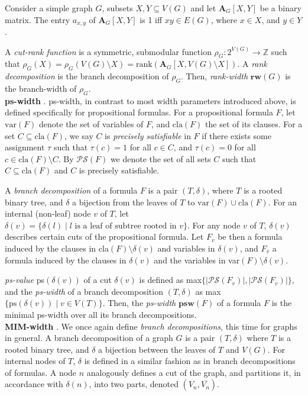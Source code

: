\documentclass{article}
\begin{document}
Consider a simple graph $G$, subsets $X,Y \subseteq V(G)$ and let $\mathbf{A}_G[X,Y]$ be a binary matrix.
The entry $a_{x,y}$ of $\mathbf{A}_G[X,Y]$ is 1 iff $xy \in E(G)$, where $x\in X$, and $y\in Y$.

A {\em cut-rank function} is a symmetric, submodular function $\rho_G : 2^{V(G)} \rightarrow \mathbb{Z}$ such that $\rho_G(X)=\rho_G(V(G)\setminus X) = \text{rank}(\mathbf{A}_G[X, V(G)\setminus X])$.
A {\em rank decomposition} is the branch decomposition of $\rho_G$.
Then, {\em rank-width} $\textbf{rw}(G)$ is the branch-width of $\rho_G$. \\


\noindent
\textbf{ps-width} \cite{DBLP:conf/sat/SaetherTV14}.
ps-width, in contrast to most width parameters introduced above, is defined specifically for propositional formulas.
For a propositional formula $F$, let $\text{var}(F)$ denote the set of variables of $F$, and $\text{cla}(F)$ the set of its clauses.
For a set $C \subseteq \text{cla}(F)$, we say $C$ is {\em precisely satisfiable} in $F$ if there exists some assignment $\tau$ such that $\tau(c)=1$ for all $c\in C$, and $\tau(c)=0$ for all $c \in \text{cla}(F)\setminus C$.
By $\mathcal{PS}(F)$ we denote the set of all sets $C$ such that $C \subseteq \text{cla}(F)$ and $C$ is precisely satisfiable.


A {\em branch decomposition} of a formula $F$ is a pair $(T, \delta)$, where $T$ is a rooted binary tree, and $\delta$ a bijection from the leaves of $T$ to $\text{var}(F) \cup \text{cla}(F)$.
For an internal (non-leaf) node $v$ of $T$, let $\delta(v) = \{ \delta(l) \; | \; l \text{ is a leaf of subtree rooted in } v \}$.
For any node $v$ of $T$, $\delta(v)$ describes certain cuts of the propositional formula.
Let $F_v$ be then a formula induced by the clauses in cla$(F)\setminus \delta(v)$ and variables in $\delta(v)$, and $F_{\overline{v}}$ a formula induced by the clauses in $\delta(v)$ and the variables in var$(F)\setminus \delta(v)$.

{\em ps-value} ps$(\delta(v))$ of a cut $\delta(v)$ is defined as max$\{|\mathcal{PS}(F_v)|, |\mathcal{PS}(F_{\overline{v}})|\}$, and the {\em ps-width} of a branch decomposition $(T,\delta)$ as max$\{ \text{ps}(\delta(v)) \; | \; v \in V(T) \}$. 
Then, the {\em ps-width} $\mathbf{psw}(F)$ of a formula $F$ is the minimal ps-width over all its branch decompositions.\\

\noindent
\textbf{MIM-width} \cite{DBLP:conf/sat/SaetherTV14, PHD:vatshelle}.
We once again define {\em branch decompositions}, this time for graphs in general.
A branch decomposition of a graph $G$ is a pair $(T, \delta)$ where $T$ is a rooted binary tree, and $\delta$ a bijection between the leaves of $T$ and $V(G).$
For internal nodes of $T$, $\delta$ is defined in a similar fashion as in branch decompositions of formulas.
A node $n$ analogously defines a cut of the graph, and partitions it, in accordance with $\delta(n)$, into two parts, denoted $(V_n, \overline{V_n})$.
\end{document}
